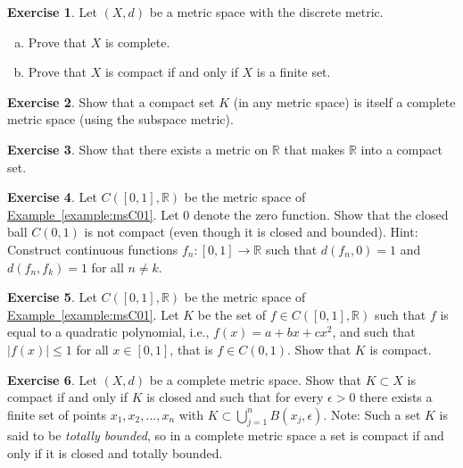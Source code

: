 \documentclass[12pt,openany]{book}
\newcommand{\abs}[1]{\left\lvert {#1} \right\rvert}
\newcommand{\R}{{\mathbb{R}}}
\newcommand{\myindex}[1]{#1\index{#1}}
\theoremstyle{plain}
\theoremstyle{remark}
\theoremstyle{definition}
\newenvironment{exbox}{%
    \def\FrameCommand{\vrule width 1pt \relax\hspace{10pt}}%
    \MakeFramed{\advance\hsize-\width\FrameRestore}%
}{%
    \endMakeFramed
}
\newenvironment{exparts}{%
    \leavevmode\begin{enumerate}[a),noitemsep,topsep=0pt,parsep=0pt,partopsep=0pt]
}{%
    \end{enumerate}
}
\theoremstyle{exercise}
\newtheorem{exercise}{Exercise}[section]
\theoremstyle{example}
\newcommand{\exampleref}[1]{\hyperref[#1]{Example~\ref*{#1}}}
\begin{document}
\begin{exbox}
\begin{exercise}
Let $(X,d)$ be a metric space with the discrete metric.
\begin{exparts}
\item
Prove that $X$ is complete.
\item
Prove that $X$ is compact if and only if $X$ is a finite set.
\end{exparts}
\end{exercise}

\begin{exercise}
Show that a compact set $K$ (in any metric space)
is itself a complete metric space (using the subspace metric).
\end{exercise}

\begin{exercise}
Show that there exists a metric on $\R$ that makes $\R$ into a compact set.
\end{exercise}

\begin{exercise} \label{exercise:msclbounnotcompt}
Let $C([0,1],\R)$ be the metric space of \exampleref{example:msC01}.  Let $0$
denote the zero function.  Show that the closed ball
$C(0,1)$ is not compact (even though it is closed and bounded).
Hint: Construct continuous functions $f_n \colon [0,1] \to \R$ such that
$d(f_n,0) = 1$ and $d(f_n,f_k) = 1$ for all $n \not= k$.
\end{exercise}

\begin{exercise}
Let $C([0,1],\R)$ be the metric space of \exampleref{example:msC01}.
Let $K$ be the set of $f \in C([0,1],\R)$ such that
$f$ is equal to a quadratic polynomial, i.e., $f(x) = a+bx+cx^2$, and such that
$\abs{f(x)} \leq 1$ for all $x \in [0,1]$,
that is $f \in C(0,1)$.  Show that $K$ is compact.
\end{exercise}

\begin{exercise} \label{exercise:mstotbound}
Let $(X,d)$ be a complete metric space.
Show that $K \subset X$ is compact if and only if $K$ is closed
and such that for every $\epsilon > 0$
there exists a finite set of points $x_1,x_2,\ldots,x_n$ with
$K \subset \bigcup_{j=1}^n B(x_j,\epsilon)$.
Note: Such a set $K$ is said to be \emph{\myindex{totally bounded}},
so in a complete metric space a set is compact if and only
if it is closed and totally bounded.
\end{exercise}


\end{exbox}
\end{document}

